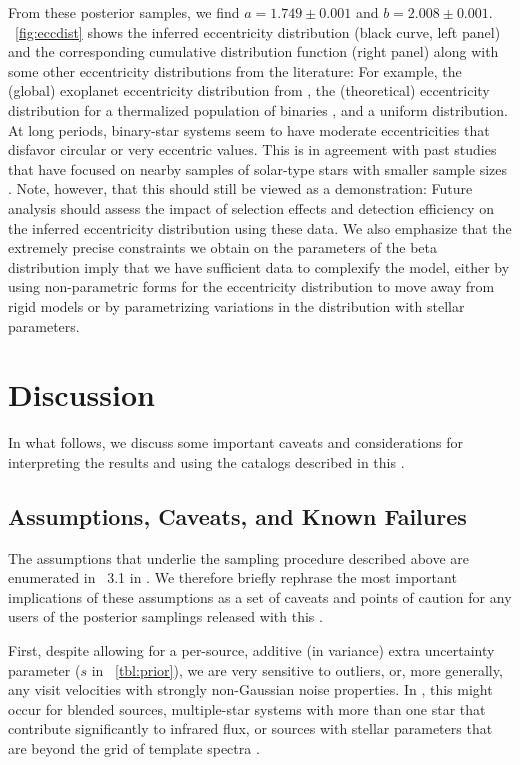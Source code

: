 \documentclass[modern]{aastex63}
\begin{document}
From these posterior samples, we find $a = 1.749 \pm 0.001$ and $b = 2.008 \pm
0.001$.
\figurename~\ref{fig:eccdist} shows the inferred eccentricity distribution
(black curve, left panel) and the corresponding cumulative distribution function
(right panel) along with some other eccentricity distributions from the
literature: For example, the (global) exoplanet eccentricity distribution from
\citet{Kipping:2013}, the (theoretical) eccentricity distribution for a
thermalized population of binaries \citep{Jeans:1919}, and a uniform
distribution.
At long periods, binary-star systems seem to have moderate eccentricities that
disfavor circular or very eccentric values.
This is in agreement with past studies that have focused on nearby samples of
solar-type stars with smaller sample sizes \citep[e.g.,][]{Duquennoy:1991,
Raghavan:2010}.
Note, however, that this should still be viewed as a demonstration: Future
analysis should assess the impact of selection effects and detection efficiency
on the inferred eccentricity distribution using these data.
We also emphasize that the extremely precise constraints we obtain on the
parameters of the beta distribution imply that we have sufficient data to
complexify the model, either by using non-parametric forms for the eccentricity
distribution to move away from rigid models or by parametrizing variations in
the distribution with stellar parameters.


\section{Discussion}\label{sec:discussion}

In what follows, we discuss some important caveats and considerations for
interpreting the results and using the catalogs described in this \documentname.

\subsection{Assumptions, Caveats, and Known Failures}
\label{sec:caveats}

The assumptions that underlie the sampling procedure described above are
enumerated in \sectionname~3.1 in \cite{Price-Whelan:2018}.
We therefore briefly rephrase the most important implications of these
assumptions as a set of caveats and points of caution for any users of the
posterior samplings released with this \documentname.

First, despite allowing for a per-source, additive (in variance) extra
uncertainty parameter ($s$ in \tablename~\ref{tbl:prior}), we are very sensitive
to outliers, or, more generally, any visit velocities with strongly non-Gaussian
noise properties.
In \apogee, this might occur for blended sources, multiple-star systems with
more than one star that contribute significantly to infrared flux, or sources
with stellar parameters that are beyond the grid of template spectra
\citep{Nidever:2015}.
\end{document}
